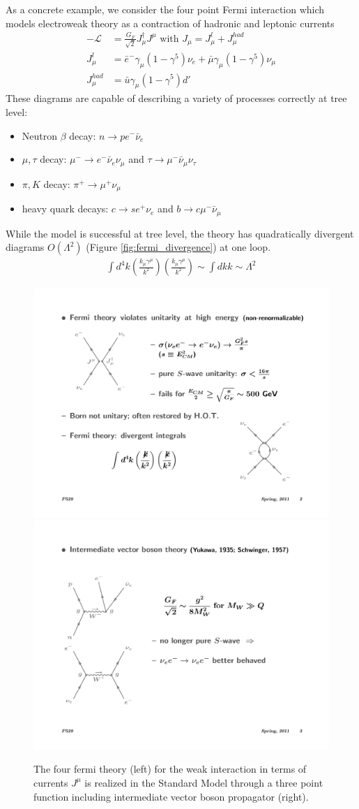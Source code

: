 As a concrete example, we consider the four point Fermi interaction which models electroweak theory as a contraction
 of hadronic and leptonic currents 
\begin{align*}
-\mathcal{L}  &= \frac{G_F}{\sqrt{2}} J^\dagger_\mu J^\mu  \text{ with } J_\mu = J^l_\mu + J^{had}_\mu\\
J_\mu^l &= \bar{e}^- \gamma_\mu (1- \gamma^5) \nu_e + \bar{\mu} \gamma_\mu (1- \gamma^5) \nu_\mu \\
J_\mu^{had} &= \bar{u} \gamma_\mu (1- \gamma^5) d'
\end{align*}
These diagrams are capable of describing a variety of processes correctly at tree level\cite{langacker}:
\begin{itemize}
\item Neutron $\beta$ decay: $n\rightarrow p e^-\bar{\nu}_e$
\item $\mu,\tau$ decay: $\mu^- \rightarrow e^- \bar{\nu}_e \nu_\mu$ and $\tau\rightarrow \mu^- \bar{\nu}_\mu \nu_\tau$ 
\item $\pi,K$ decay: $\pi^+ \rightarrow \mu^+ \nu_\mu$ 
\item heavy quark decays: $c \rightarrow s e^+ \nu_e$ and  $b \rightarrow c \mu^- \bar{\nu}_\mu$ 
\end{itemize}
While the model is successful at tree level, the theory has quadratically divergent diagrams  $O(\Lambda^2)$ (Figure \ref{fig:fermi_divergence}) at one loop.
\begin{align*}
\int d^4k \left ( \frac{k_\mu \gamma^\mu}{k^2} \right ) \left ( \frac{k_\mu \gamma^\mu}{k^2} \right ) \sim \int dk k  \sim \Lambda^2 
\end{align*}
\begin{figure}
\begin{center}
\includegraphics[width=.25\textwidth]{pics/fermi_theory}
\includegraphics[width=.35\textwidth]{pics/int_vec_boson}
\end{center}
\caption{ The four fermi theory (left) for the weak interaction in
 terms of currents $J^\mu$  is realized in the Standard Model through a three point function including intermediate vector boson propagator (right).}
\label{fig:int_vec_boson}
\end{figure}
